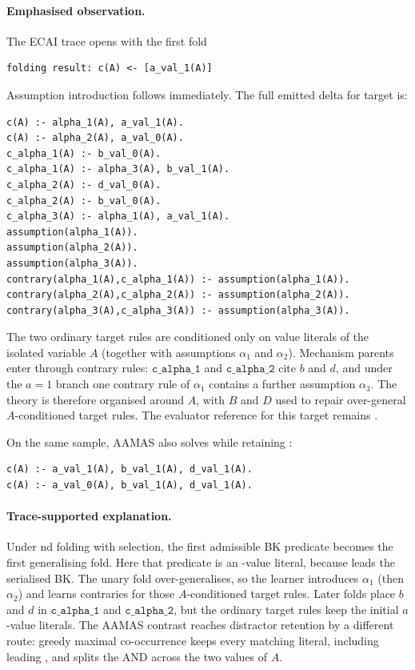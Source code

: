 \documentclass[11pt]{article}
\DeclareRobustCommand{\code}[1]{\texttt{\detokenize{#1}}}
\newcommand{\observation}{\paragraph{Emphasised observation.}}
\newcommand{\explanation}{\paragraph{Trace-supported explanation.}}
\begin{document}
\observation
The ECAI trace opens with the first fold
\begin{lstlisting}
folding result: c(A) <- [a_val_1(A)]
\end{lstlisting}
Assumption introduction follows immediately. The full emitted delta for
target \code{c} is:
\begin{lstlisting}
c(A) :- alpha_1(A), a_val_1(A).
c(A) :- alpha_2(A), a_val_0(A).
c_alpha_1(A) :- b_val_0(A).
c_alpha_1(A) :- alpha_3(A), b_val_1(A).
c_alpha_2(A) :- d_val_0(A).
c_alpha_2(A) :- b_val_0(A).
c_alpha_3(A) :- alpha_1(A), a_val_1(A).
assumption(alpha_1(A)).
assumption(alpha_2(A)).
assumption(alpha_3(A)).
contrary(alpha_1(A),c_alpha_1(A)) :- assumption(alpha_1(A)).
contrary(alpha_2(A),c_alpha_2(A)) :- assumption(alpha_2(A)).
contrary(alpha_3(A),c_alpha_3(A)) :- assumption(alpha_3(A)).
\end{lstlisting}
The two ordinary target rules are conditioned only on value literals of the
isolated variable \(A\) (together with assumptions \(\alpha_1\) and
\(\alpha_2\)). Mechanism parents enter through contrary rules:
\(\mathtt{c\_alpha\_1}\) and \(\mathtt{c\_alpha\_2}\) cite \(b\) and \(d\),
and under the \(a{=}1\) branch one contrary rule of \(\alpha_1\) contains a
further assumption \(\alpha_3\). The theory is therefore organised around
\(A\), with \(B\) and \(D\) used to repair over-general \(A\)-conditioned
target rules. The evaluator reference for this target remains
\code{c(A) :- b_val_1(A), d_val_1(A).}.

On the same sample, AAMAS also solves \code{c} while retaining \code{a}:
\begin{lstlisting}
c(A) :- a_val_1(A), b_val_1(A), d_val_1(A).
c(A) :- a_val_0(A), b_val_1(A), d_val_1(A).
\end{lstlisting}

\explanation
Under nd folding with \code{any} selection, the first admissible BK predicate
becomes the first generalising fold. Here that predicate is an \code{a}-value
literal, because \code{a} leads the serialised BK. The unary fold
over-generalises, so the learner introduces \(\alpha_1\) (then \(\alpha_2\))
and learns contraries for those \(A\)-conditioned target rules. Later folds
place \(b\) and \(d\) in \(\mathtt{c\_alpha\_1}\) and \(\mathtt{c\_alpha\_2}\),
but the ordinary target rules keep the initial \(a\)-value literals. The AAMAS
contrast reaches distractor retention by a different route: greedy maximal
co-occurrence keeps every matching literal, including leading \code{a}, and
splits the AND across the two values of \(A\).
\end{document}
